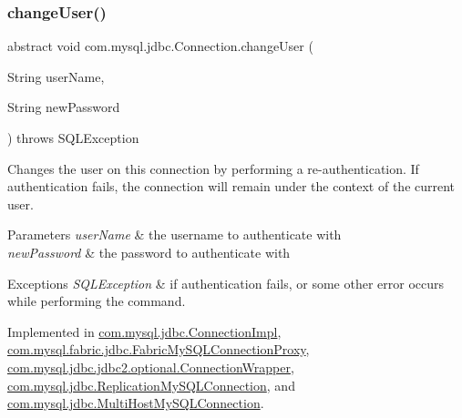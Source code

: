 \subsubsection{\texorpdfstring{change\+User()}{changeUser()}}
{\footnotesize\ttfamily abstract void com.\+mysql.\+jdbc.\+Connection.\+change\+User (\begin{DoxyParamCaption}\item[{String}]{user\+Name,  }\item[{String}]{new\+Password }\end{DoxyParamCaption}) throws S\+Q\+L\+Exception\hspace{0.3cm}{\ttfamily [abstract]}}

Changes the user on this connection by performing a re-\/authentication. If authentication fails, the connection will remain under the context of the current user.


\begin{DoxyParams}{Parameters}
{\em user\+Name} & the username to authenticate with \\
\hline
{\em new\+Password} & the password to authenticate with \\
\hline
\end{DoxyParams}

\begin{DoxyExceptions}{Exceptions}
{\em S\+Q\+L\+Exception} & if authentication fails, or some other error occurs while performing the command. \\
\hline
\end{DoxyExceptions}


Implemented in \mbox{\hyperlink{classcom_1_1mysql_1_1jdbc_1_1_connection_impl_a60c2e281bd048fd455dcd75f2c968c27}{com.\+mysql.\+jdbc.\+Connection\+Impl}}, \mbox{\hyperlink{classcom_1_1mysql_1_1fabric_1_1jdbc_1_1_fabric_my_s_q_l_connection_proxy_a3feeb42e32ece9eb869d579ea9d3b457}{com.\+mysql.\+fabric.\+jdbc.\+Fabric\+My\+S\+Q\+L\+Connection\+Proxy}}, \mbox{\hyperlink{classcom_1_1mysql_1_1jdbc_1_1jdbc2_1_1optional_1_1_connection_wrapper_a4c5b794f1bdf800b863c46fdcbf2ce97}{com.\+mysql.\+jdbc.\+jdbc2.\+optional.\+Connection\+Wrapper}}, \mbox{\hyperlink{classcom_1_1mysql_1_1jdbc_1_1_replication_my_s_q_l_connection_adf68b57206ecf667f69b8d6243ac50d7}{com.\+mysql.\+jdbc.\+Replication\+My\+S\+Q\+L\+Connection}}, and \mbox{\hyperlink{classcom_1_1mysql_1_1jdbc_1_1_multi_host_my_s_q_l_connection_aae20768c54f41ae55ba08171a06b4a11}{com.\+mysql.\+jdbc.\+Multi\+Host\+My\+S\+Q\+L\+Connection}}.

